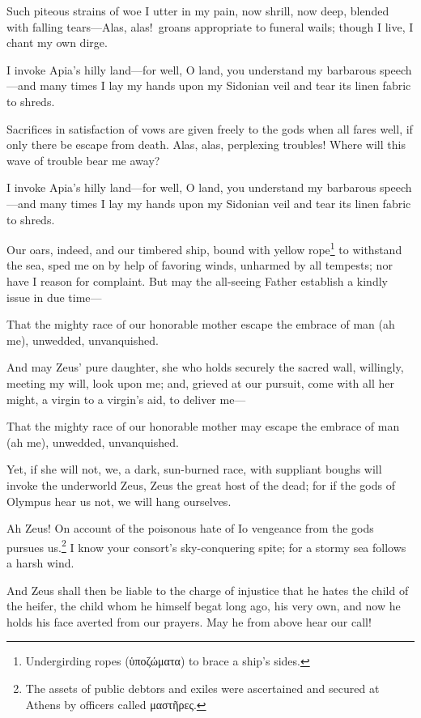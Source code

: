 \documentclass[12pt]{article}
\begin{document}
Such piteous strains of woe I utter in my pain, now shrill, now deep, blended with falling tears---Alas, alas!~groans appropriate to funeral wails; though I live, I chant my own dirge.

I invoke Apia's hilly land---for well, O land, you understand my barbarous speech---and many times I lay my hands upon my Sidonian veil and tear its linen fabric to shreds.

Sacrifices in satisfaction of vows are given freely to the gods when all fares well, if only there be escape from death. Alas, alas, perplexing troubles! Where will this wave of trouble bear me away?

I invoke Apia's hilly land---for well, O land, you understand my barbarous speech---and many times I lay my hands upon my Sidonian veil and tear its linen fabric to shreds.

Our oars, indeed, and our timbered ship, bound with yellow rope\footnote{Undergirding ropes (ὑποζώματα) to brace a ship's sides.} to withstand the sea, sped me on by help of favoring winds, unharmed by all tempests; nor have I reason for complaint. But may the all-seeing Father establish a kindly issue in due time---

That the mighty race of our honorable mother escape the embrace of man (ah me), unwedded, unvanquished.

And may Zeus' pure daughter, she who holds securely the sacred wall, willingly, meeting my will, look upon me; and, grieved at our pursuit, come with all her might, a virgin to a virgin's aid, to deliver me---

That the mighty race of our honorable mother may escape the embrace of man (ah me), unwedded, unvanquished.

Yet, if she will not, we, a dark, sun-burned race, with suppliant boughs will invoke the underworld Zeus, Zeus the great host of the dead; for if the gods of Olympus hear us not, we will hang ourselves.

Ah Zeus! On account of the poisonous hate of Io vengeance from the gods pursues us.\footnote{The assets of public debtors and exiles were ascertained and secured at Athens by officers called μαστῆρες.} I know your consort's sky-conquering spite; for a stormy sea follows a harsh wind.

And Zeus shall then be liable to the charge of injustice that he hates the child of the heifer, the child whom he himself begat long ago, his very own, and now he holds his face averted from our prayers. May he from above hear our call!
\end{document}

